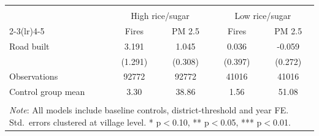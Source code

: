 \begin{tabular}{l*{4}{c}} 
\\[-1.8ex]\hline \hline \\[-1.8ex]
                    &\multicolumn{2}{c}{High rice/sugar}        &\multicolumn{2}{c}{Low rice/sugar}         \\\cmidrule(lr){2-3}\cmidrule(lr){4-5}
                    &\multicolumn{1}{c}{Fires}&\multicolumn{1}{c}{PM 2.5}&\multicolumn{1}{c}{Fires}&\multicolumn{1}{c}{PM 2.5}\\
\midrule
Road built          &       3.191\sym{**} &       1.045\sym{***}&       0.036         &      -0.059         \\
                    &     (1.291)         &     (0.308)         &     (0.397)         &     (0.272)         \\
\midrule
Observations        &       92772         &       92772         &       41016         &       41016         \\
Control group mean  &        3.30         &       38.86         &        1.56         &       51.08         \\
\hline \hline \\[-1.8ex] 
\multicolumn{5}{p{\linewidth}}{\small 
\noindent \textit{Note}: All models 
include baseline controls, 
district-threshold and year FE. 
Std.\ errors clustered at village 
level. 
* p$<$0.10, ** p$<$0.05, 
*** p$<$0.01.} 
\end{tabular}
